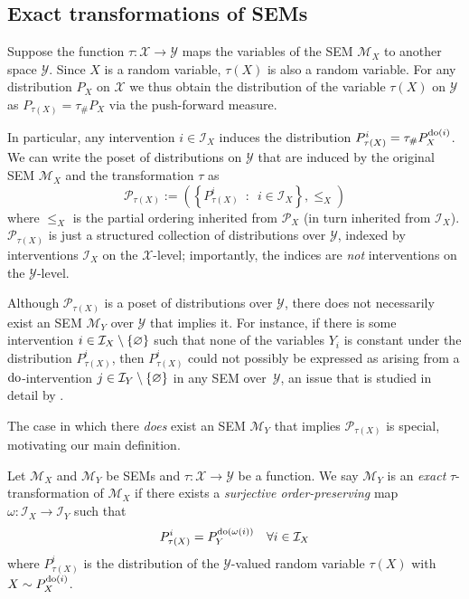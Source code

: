 \subsection{Exact transformations of SEMs}

Suppose the function ${\tau: \mathcal{X} \to \mathcal{Y}}$ maps the variables of the SEM $\mathcal{M}_X$ to another space $\mathcal{Y}$.
Since $X$ is a random variable, $\tau(X)$ is also a random variable.
For any distribution $P_X$ on $\mathcal{X}$ we thus obtain the distribution of the variable $\tau(X)$ on $\mathcal{Y}$ as $P_{\tau(X)} = \tau_{\#}P_X$ via the push-forward measure. 


In particular, any intervention $i \in \mathcal{I}_X$ induces the distribution $P_{\tau(X)}^{i} = \tau_{\#}P_X^{\operatorname{do}(i)}$.
We can write the poset of distributions on $\mathcal{Y}$ that are induced by the original SEM $\mathcal{M}_X$ and the transformation $\tau$ as
\[\mathcal{P}_{\tau(X)} := \left( \left\{ P_{\tau(X)}^{i} \enspace : \enspace i \in \mathcal{I}_X \right\}, \leq_X \right) \]
where $\leq_X$ is the partial ordering inherited from $\mathcal{P}_X$ (in turn inherited from $\mathcal{I}_X$).
$\mathcal{P}_{\tau(X)}$ is just a structured collection of distributions over $\mathcal{Y}$, indexed by interventions $\mathcal{I}_X$ on the $\mathcal{X}$-level; importantly, the indices are \emph{not} interventions on the $\mathcal{Y}$-level.



Although $\mathcal{P}_{\tau(X)}$ is a poset of distributions over $\mathcal{Y}$, there does not necessarily exist an SEM $\mathcal{M}_Y$ over $\mathcal{Y}$ that implies it.
For instance, if there is some intervention ${i \in \mathcal{I}_X \setminus \{ \varnothing \}}$ such that none of the variables $Y_i$ is constant under the distribution $P_{\tau(X)}^{i}$, then $P_{\tau(X)}^{i}$ could not possibly be expressed as arising from a $\operatorname{do}$-intervention $j\in \mathcal{I}_Y \setminus \{\varnothing\}$ in any SEM over~$\mathcal{Y}$, an issue that is studied in detail by \cite{eberhardt2016green}.

The case in which there \emph{does} exist an SEM $\mathcal{M}_Y$ that implies $\mathcal{P}_{\tau(X)}$ is special, motivating our main definition.

\medskip

\begin{definition}\label{def:exacttrafos}
Let $\mathcal{M}_X$ and $\mathcal{M}_Y$ be SEMs and $\tau: \mathcal{X} \to \mathcal{Y}$ be a function.
We say $\mathcal{M}_Y$ is an \emph{exact}  $\tau$-transformation of $\mathcal{M}_X$ if there exists a \emph{surjective order-preserving} map $\omega:\mathcal{I}_X\rightarrow \mathcal{I}_Y$ such that
\[ P_{\tau(X)}^{i} = P_Y^{\operatorname{do}(\omega(i))} \quad \forall i \in \mathcal{I}_X \]
where $P_{\tau(X)}^{i}$ is the distribution of the $\mathcal{Y}$-valued random variable $\tau(X)$ with $X \sim P_X^{\operatorname{do}(i)}$.
\end{definition}

